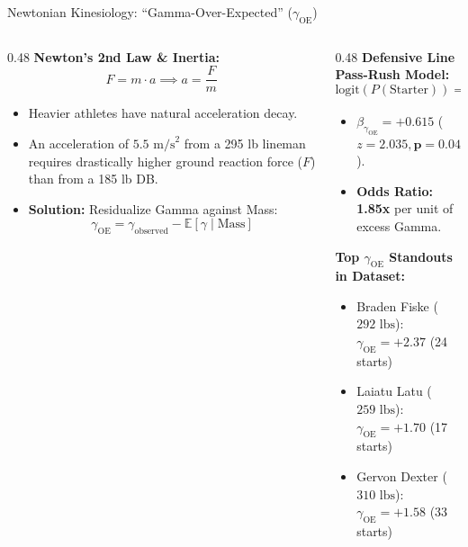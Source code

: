 \documentclass[aspectratio=169, 10pt]{beamer}
\begin{document}
\begin{frame}{Newtonian Kinesiology: ``Gamma-Over-Expected'' ($\gamma_{\text{OE}}$)}
  \begin{columns}[T]
    \begin{column}{0.48\textwidth}
      \textbf{Newton's 2nd Law \& Inertia:}
      $$F = m \cdot a \implies a = \frac{F}{m}$$
      \begin{itemize}
        \item Heavier athletes have natural acceleration decay.
        \item An acceleration of $5.5\text{ m/s}^2$ from a 295 lb lineman requires drastically higher ground reaction force ($F$) than from a 185 lb DB.
        \item \textbf{Solution:} Residualize Gamma against Mass:
        $$\gamma_{\text{OE}} = \gamma_{\text{observed}} - \mathbb{E}[\gamma \mid \text{Mass}]$$
      \end{itemize}
    \end{column}
    \begin{column}{0.48\textwidth}
      \textbf{Defensive Line Pass-Rush Model:}
      $$\text{logit}(P(\text{Starter})) = \beta_0 + \beta_1 \gamma_{\text{OE}} + \beta_2 \text{Mass}$$
      \begin{itemize}
        \item $\beta_{\gamma_{\text{OE}}} = +0.615$ ($z = 2.035, \mathbf{p = 0.042}$).
        \item \textbf{Odds Ratio: 1.85x} per unit of excess Gamma.
      \end{itemize}
      \textbf{Top $\gamma_{\text{OE}}$ Standouts in Dataset:}
      \begin{itemize}
        \footnotesize
        \item Braden Fiske ($292\text{ lbs}$): $\gamma_{\text{OE}} = \mathbf{+2.37}$ (24 starts)
        \item Laiatu Latu ($259\text{ lbs}$): $\gamma_{\text{OE}} = \mathbf{+1.70}$ (17 starts)
        \item Gervon Dexter ($310\text{ lbs}$): $\gamma_{\text{OE}} = \mathbf{+1.58}$ (33 starts)
      \end{itemize}
    \end{column}
  \end{columns}
\end{frame}
\end{document}
